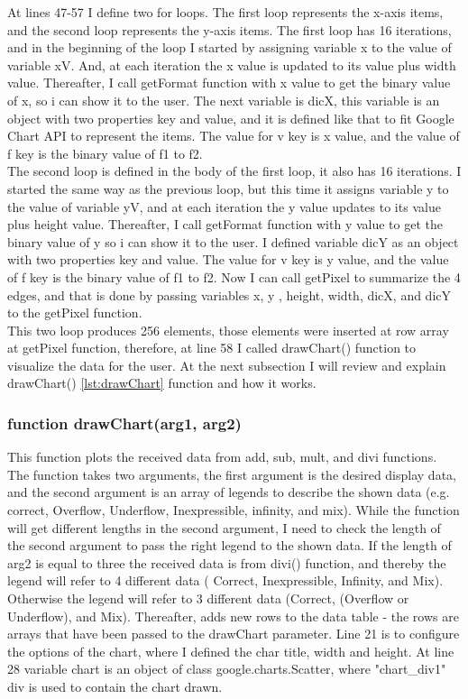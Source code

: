 \documentclass[11pt]{article}
\begin{document}
At lines 47-57 I define two for loops. The first loop represents the x-axis items, and the second loop represents the y-axis items.
The first loop has 16 iterations, and in the beginning of the loop I started by assigning variable x to the value of variable xV. And, at each iteration the x value is updated to its value plus width value. Thereafter, I call getFormat function with x value to get the binary value of x, so i can show it to the user. The next variable is dicX, this variable is an object with two properties key and value, and it is defined like that to fit Google Chart API to represent the items. The value for v key is x value, and the value of f key is the binary value of f1 to f2.\\
The second loop is defined in the body of the first loop, it also has 16 iterations. I started the same way as the previous loop, but this time it assigns variable y to the value of variable yV, and at each iteration the y value updates to its value plus height value. Thereafter, I call getFormat function with y value to get the binary value of y so i can show it to the user. I defined variable dicY as an object with two properties key and value. The value for v key is y value, and the value of f key is the binary value of f1 to f2. Now I can call getPixel to summarize the 4 edges, and that is done by passing variables x, y , height, width, dicX, and dicY to the getPixel function.\\
This two loop produces 256 elements, those elements were inserted at row array at getPixel function, therefore, at line 58 I called drawChart() function to visualize the data for the user. At the next subsection I will review and explain drawChart() \ref{lst:drawChart} function and how it works.\\

\subsubsection{function drawChart(arg1, arg2) }
This function plots the received data from add, sub, mult, and divi functions. The function takes two arguments, the first argument is the desired display data, and the second argument is an array of legends to describe the shown data (e.g. correct, Overflow, Underflow, Inexpressible, infinity, and mix). While the function will get different lengths in the second argument, I need to check the length of the second argument to pass the right legend to the shown data. If the length of arg2 is equal to three the received data is from divi() function, and thereby the legend will refer to 4 different data ( Correct, Inexpressible, Infinity, and Mix). Otherwise the legend will refer to 3 different data (Correct, (Overflow or Underflow), and Mix). Thereafter, adds new rows to the data table - the rows are arrays that have been passed to the drawChart parameter. Line 21 is to configure the options of the chart, where I defined the char title, width and height. At line 28 variable chart is an object of class google.charts.Scatter,  where "chart\_div1" div is used to contain the chart drawn.\\
\end{document}
